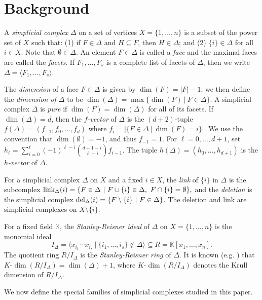 \documentclass[12pt]{amsart}
\theoremstyle{plain}
\theoremstyle{definition}
\theoremstyle{remark}
\numberwithin{equation}{section}
\numberwithin{equation}{section}
\begin{document}
\section{Background}\label{sec:background}
A {\it simplicial complex} $\Delta$ on a set of vertices $X = \{1,\ldots,n\}$ is a
subset of the power set of $X$ such that: (1) if $F \in \Delta$ and 
$H \subseteq F$, then $H \in \Delta$; and (2) $\{i\} \in \Delta$ for all $i \in X$.  Note that $\emptyset \in \Delta$. An element $F \in \Delta$ is called a {\it face} and the maximal
faces are called the {\it facets}.  If $F_1,\ldots,F_s$ is a complete
list of facets of $\Delta$, then we write $\Delta = \langle F_1,\ldots,F_s\rangle$.  

The {\it dimension} of a face $F \in \Delta$ 
is given by $\dim(F) = |F|-1$; we then define the {\it dimension of $\Delta$}
to be $\dim(\Delta) = \max\{\dim(F) ~|~ F \in \Delta\}$.  A simplicial
complex $\Delta$ is {\it pure} if $\dim(F) = \dim(\Delta)$ for all
of its facets.   If $\dim(\Delta) =d$, then the {\it $f$-vector} of
$\Delta$ is the $(d+2)$-tuple $f(\Delta)= (f_{-1},f_0,\ldots,f_d)$ where
$f_i = |\{F \in \Delta ~|~ \dim(F) = i\}|$. We use the convention that
$\dim(\emptyset) = -1$, and thus $f_{-1} = 1$.  For $\ell = 0,\ldots,d+1$,
set
$h_\ell= \sum_{i=0}^\ell (-1)^{\ell-i}\binom{d+1-i}{\ell-i} f_{i-1}$.
The tuple $h(\Delta)=(h_0,\ldots,h_{d+1})$ is the {\it $h$-vector} of
$\Delta$.


For a simplicial complex $\Delta$ on $X$ and a fixed $i \in X$, the {\it link} of $\{i\}$ in $\Delta$
is the subcomplex
${\rm link}_\Delta(i)   =  \{F \in \Delta ~|~
    F \cup \{i\} \in \Delta,~ F \cap \{i\} = \emptyset\},$
and the {\it deletion} is the simplicial complex
${\rm del}_\Delta(i)  =  \{F \setminus \{i\} ~|~
    F \in \Delta\}$.
    The deletion and link are simplicial complexes
    on $X \setminus \{i\}$.

For a fixed field $\mathbb{K}$, the {\it Stanley-Reisner ideal}
of $\Delta$ on $X = \{1,\ldots,n\}$ is the monomial ideal
$$I_\Delta = \langle x_{i_1}\cdots x_{i_s} ~|~ \{i_1,\ldots,i_s\} \not\in \Delta \rangle \subseteq R= \mathbb{K}[x_1,\ldots,x_n].$$
The quotient ring $R/I_\Delta$ is the {\it Stanley-Reisner ring}
of $\Delta$.
It is known (e.g. \cite[Corollary 6.3.5]{VBook}) that $K$-$\dim(R/I_\Delta) = \dim(\Delta)+1$, 
where $K$-$\dim(R/I_\Delta)$ denotes the Krull dimension 
of $R/I_\Delta$.

We now define the special families of simplicial complexes studied
in this paper.
\end{document}
